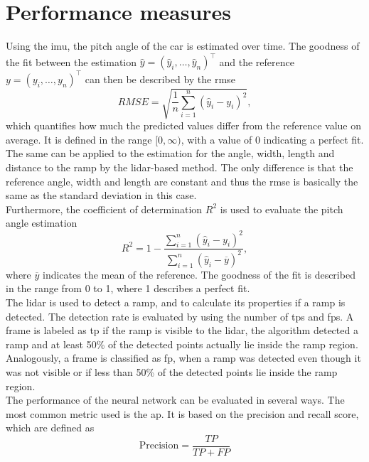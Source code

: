 \section{Performance measures}
Using the \gls{imu}, the pitch angle of the car is estimated over time.
The goodness of the fit between the estimation $\hat{y} = (\hat{y}_i, \dots, \hat{y}_n)^\intercal$ and the reference $y = (y_i, \dots, y_n)^\intercal$ can then be described by the \gls{rmse}
\begin{equation}
	RMSE = \sqrt{\frac{1}{n}\sum_{i = 1}^n(\hat{y}_i - y_i)^2},
\end{equation}
which quantifies how much the predicted values differ from the reference value on average.
It is defined in the range $[0, \infty)$, with a value of 0 indicating a perfect fit.\\
The same can be applied to the estimation for the angle, width, length and distance to the ramp by the \gls{lidar}-based method.
The only difference is that the reference angle, width and length are constant and thus the \gls{rmse} is basically the same as the standard deviation in this case.\\
Furthermore, the coefficient of determination $R^2$ is used to evaluate the pitch angle estimation
\begin{equation}
	R^2 = 1 - \frac{\sum\limits_{i = 1}^n(\hat{y}_i - y_i)^2}{\sum\limits_{i = 1}^n(\hat{y}_i - \overline{y})^2},
\end{equation}
where $\overline{y}$ indicates the mean of the reference.
The goodness of the fit is described in the range from 0 to 1, where 1 describes a perfect fit.\\
The \gls{lidar} is used to detect a ramp, and to calculate its properties if a ramp is detected.
The detection rate is evaluated by using the number of \glspl{tp} and \glspl{fp}.
A frame is labeled as \gls{tp} if the ramp is visible to the \gls{lidar}, the algorithm detected a ramp and at least 50\% of the detected points actually lie inside the ramp region.
Analogously, a frame is classified as \gls{fp}, when a ramp was detected even though it was not visible or if less than 50\% of the detected points lie inside the ramp region.\\
The performance of the neural network can be evaluated in several ways.
The most common metric used is the \gls{ap}.
It is based on the precision and recall score, which are defined as
\begin{equation}
	\text{Precision} = \frac{TP}{TP+FP}
\end{equation}
